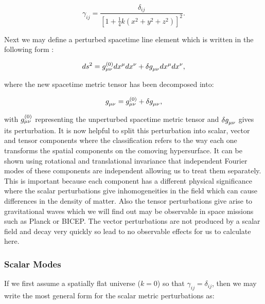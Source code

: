 \documentclass[a4paper,12pt,twoside]{report}
\begin{document}
\begin{equation} \label{eq2.33}
\gamma_{ij} = \frac{\delta_{ij}}{\left[1 + \frac{1}{4} k(x^2 + y^2+ z^2) \right]^{2}}.
\end{equation}

Next we may define a perturbed spacetime line element \cite{Mukhanov:1990me} which is written in the following form :

\begin{equation} \label{eq2.34}
ds^{2} = \tensor*{g}{^{(0)}_\mu_\nu} dx^{\mu} dx^{\nu} + \delta \tensor{g}{_{\mu \nu}} dx^{\mu} dx^{\nu},
\end{equation}

where the new spacetime metric tensor has been decomposed into:

\begin{equation} \label{eq2.35}
\tensor{g}{_{\mu \nu}} = \tensor*{g}{^{(0)}_\mu_\nu} + \delta \tensor{g}{_{\mu \nu}},
\end{equation}

with $\tensor*{g}{^{(0)}_\mu_\nu}$ representing the unperturbed spacetime metric tensor and $\delta \tensor{g}{_{\mu \nu}}$ gives its perturbation. It is now helpful to split this perturbation into scalar, vector and tensor components \cite{Mukhanov:1990me, Langlois:2004de, Weinberg:2008zzc} where the classification refers to the way each one transforms the spatial components on the comoving hypersurface. It can be shown \cite{Baumann:2009ds} using rotational and translational invariance that independent Fourier modes of these components are independent allowing us to treat them separately. This is important because each component has a different physical significance where the scalar perturbations give inhomogeneities in the field which can cause differences in the density of matter. Also the tensor perturbations give arise to gravitational waves which we will find out may be observable in space missions such as Planck or BICEP. The vector perturbations are not produced by a scalar field and decay very quickly so lead to no observable effects for us to calculate here.

\subsubsection{Scalar Modes} \label{subsubsec:ScalModes}

If we first assume a spatially flat universe ($k = 0$) so that $\gamma_{ij} = \delta_{ij}$, then we may write the most general form \cite{Mukhanov:1990me, Langlois:2004de, Baumann:2009ds, lyth2009primordial, Weinberg:2008zzc} for the scalar metric perturbations as:
\end{document}

